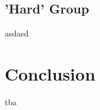 \documentclass[10pt, a4paper]{article}
\begin{document}
\subsection{'Hard' Group} %
\label{sub:hard}
asdasd

\section{Conclusion} %
\label{sec:conclusion}
tba
\clearpage
\newpage 


\end{document}

